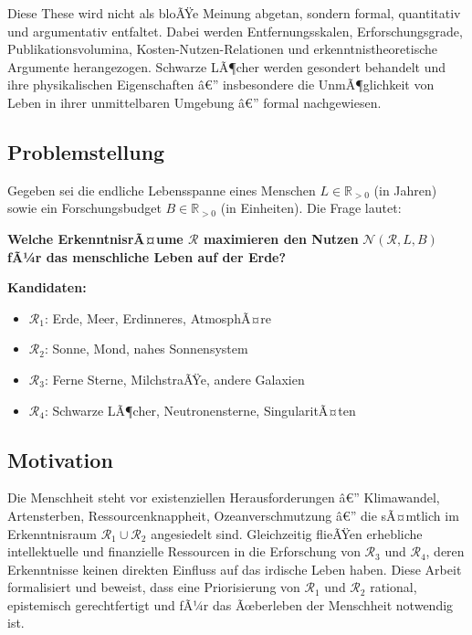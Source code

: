 ﻿\documentclass[a4paper,12pt]{article}
\theoremstyle{definition}
\begin{document}
Diese These wird nicht als bloÃŸe Meinung abgetan, sondern formal, quantitativ
und argumentativ entfaltet. Dabei werden Entfernungsskalen, Erforschungsgrade,
Publikationsvolumina, Kosten-Nutzen-Relationen und erkenntnistheoretische
Argumente herangezogen. Schwarze LÃ¶cher werden gesondert behandelt und ihre
physikalischen Eigenschaften â€” insbesondere die UnmÃ¶glichkeit von Leben in
ihrer unmittelbaren Umgebung â€” formal nachgewiesen.

\subsection{Problemstellung}

Gegeben sei die endliche Lebensspanne eines Menschen $L \in \mathbb{R}_{>0}$
(in Jahren) sowie ein Forschungsbudget $B \in \mathbb{R}_{>0}$ (in
Einheiten). Die Frage lautet:

\begin{center}
\textbf{Welche ErkenntnisrÃ¤ume $\mathcal{R}$ maximieren den Nutzen}
$\mathcal{N}(\mathcal{R}, L, B)$ \textbf{fÃ¼r das menschliche Leben auf der Erde?}
\end{center}

\textbf{Kandidaten:}
\begin{itemize}
    \item $\mathcal{R}_1$: Erde, Meer, Erdinneres, AtmosphÃ¤re
    \item $\mathcal{R}_2$: Sonne, Mond, nahes Sonnensystem
    \item $\mathcal{R}_3$: Ferne Sterne, MilchstraÃŸe, andere Galaxien
    \item $\mathcal{R}_4$: Schwarze LÃ¶cher, Neutronensterne, SingularitÃ¤ten
\end{itemize}

\subsection{Motivation}

Die Menschheit steht vor existenziellen Herausforderungen â€” Klimawandel,
Artensterben, Ressourcenknappheit, Ozeanverschmutzung â€” die sÃ¤mtlich im
Erkenntnisraum $\mathcal{R}_1 \cup \mathcal{R}_2$ angesiedelt sind. Gleichzeitig
flieÃŸen erhebliche intellektuelle und finanzielle Ressourcen in die Erforschung
von $\mathcal{R}_3$ und $\mathcal{R}_4$, deren Erkenntnisse keinen direkten
Einfluss auf das irdische Leben haben. Diese Arbeit formalisiert und beweist,
dass eine Priorisierung von $\mathcal{R}_1$ und $\mathcal{R}_2$ rational,
epistemisch gerechtfertigt und fÃ¼r das Ãœberleben der Menschheit notwendig ist.
\end{document}
